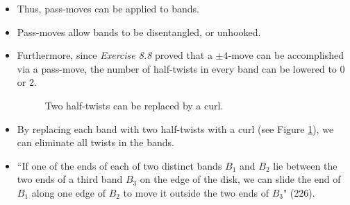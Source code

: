 \documentclass[titlepage]{article}
\numberwithin{figure}{section}
\numberwithin{table}{section}
\numberwithin{equation}{section}
\newcommand{\dq}[2]{``#1" (#2).}
\begin{document}
\begin{itemize}
\begin{itemize}
        \item Thus, pass-moves can be applied to bands.
        \item Pass-moves allow bands to be disentangled, or unhooked.
        \item Furthermore, since \emph{Exercise 8.8} proved that a $\pm 4$-move can be accomplished via a pass-move, the number of half-twists in every band can be lowered to 0 or 2.
        \begin{figure}[h!]
            \centering
            \caption{Two half-twists can be replaced by a curl.}
            \label{fig:twistcurl}
        \end{figure}
        \item By replacing each band with two half-twists with a curl (see Figure \ref{fig:twistcurl}), we can eliminate all twists in the bands.
        \item \dq{If one of the ends of each of two distinct bands $B_1$ and $B_2$ lie between the two ends of a third band $B_3$ on the edge of the disk, we can slide the end of $B_1$ along one edge of $B_2$ to move it outside the two ends of $B_3$}{226}

\end{itemize}
\end{itemize}
\end{document}
